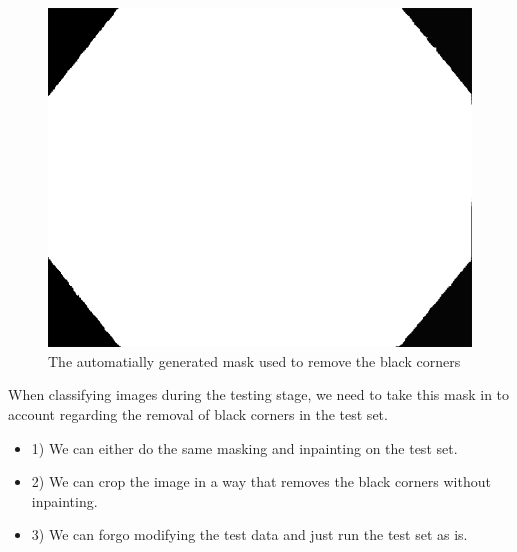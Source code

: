 \begin{figure}[h]
\centering
\includegraphics[scale=0.3]{experiments/figures/default-corner.png}
\caption{The automatially generated mask used to remove the black corners}
\label{fig:corner_mask}
\end{figure}

When classifying images during the testing stage, we need to take this mask in to account regarding the removal of black corners in the test set.
\begin{itemize}

\item 1) We can either do the same masking and inpainting on the test set. \\
\item 2) We can crop the image in a way that removes the black corners without inpainting.\\
\item 3) We can forgo modifying the test data and just run the test set as is. \\
\end{itemize}

